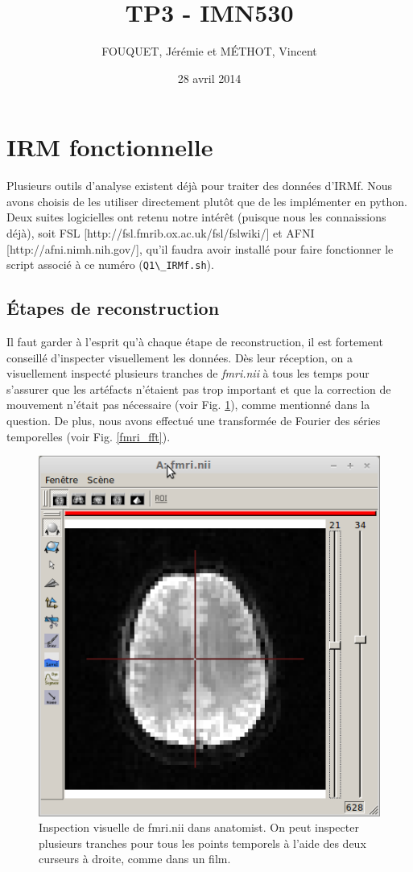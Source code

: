 \documentclass[a4paper]{article}
\title{TP3 - IMN530}
\author{FOUQUET, Jérémie et MÉTHOT, Vincent}
\date{28 avril 2014}
\begin{document}
\maketitle

\section{IRM fonctionnelle \label{fmri}}

Plusieurs outils d'analyse existent déjà pour traiter des données d'IRMf. Nous avons choisis de les utiliser directement plutôt que de les implémenter en python. Deux suites logicielles ont retenu notre intérêt (puisque nous les connaissions déjà), soit FSL [http://fsl.fmrib.ox.ac.uk/fsl/fslwiki/] et AFNI [http://afni.nimh.nih.gov/], qu'il faudra avoir installé pour faire fonctionner le script associé à ce numéro (\lstinline{Q1\_IRMf.sh}).

\subsection{Étapes de reconstruction}

Il faut garder à l'esprit qu'à chaque étape de reconstruction, il est fortement conseillé d'inspecter visuellement les données. Dès leur réception, on a visuellement inspecté plusieurs tranches de \emph{fmri.nii} à tous les temps pour s'assurer que les artéfacts n'étaient pas trop important et que la correction de mouvement n'était pas nécessaire (voir Fig. \ref{fmri_anatomist}), comme mentionné dans la question. De plus, nous avons effectué une transformée de Fourier des séries temporelles (voir Fig. \ref{fmri_fft}).

\begin{figure}
   \centering
   \includegraphics[width=.7\textwidth]{fmri_anatomist}
   \caption{\label{fmri_anatomist} Inspection visuelle de fmri.nii dans anatomist. On peut inspecter plusieurs tranches pour tous les points temporels à l'aide des deux curseurs à droite, comme dans un film.}
\end{figure}
\end{document}
